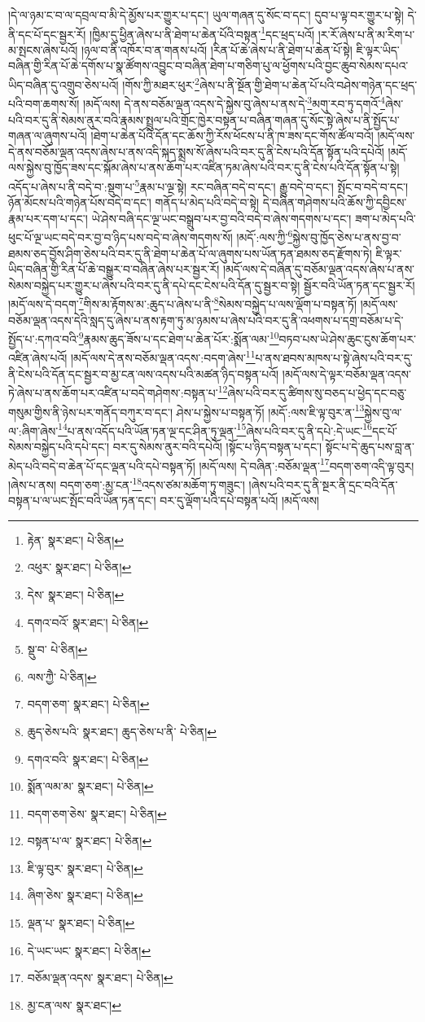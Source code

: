 །དེ་ལ་ཉམ་ང་བ་ལ་དབྲལ་བ་མི་དེ་མྱོས་པར་གྱུར་པ་དང་། ཡུལ་གཞན་དུ་སོང་བ་དང་། དུབ་པ་ལྟ་བར་གྱུར་པ་སྟེ། དེ་ནི་དང་པོ་དང་སྦྱར་རོ། །ཁྱིམ་དུ་ཕྱིན་ཞེས་པ་ནི་ཐེག་པ་ཆེན་པོའི་བསྟན་\footnote{རྟེན་  སྣར་ཐང་།  པེ་ཅིན། }དང་ཕྲད་པའོ། །ར་རོ་ཞེས་པ་ནི་མ་རིག་པ་མ་སྤངས་ཞེས་པའོ། །ཉལ་བ་ནི་འཁོར་བ་ན་གནས་པའོ། །རིན་པོ་ཆེ་ཞེས་པ་ནི་ཐེག་པ་ཆེན་པོ་སྟེ། ཇི་ལྟར་ཡིད་བཞིན་གྱི་རིན་པོ་ཆེ་དགོས་པ་སྣ་ཚོགས་འབྱུང་བ་བཞིན་ཐེག་པ་གཅིག་པུ་ལ་ཕྱོགས་པའི་བྱང་ཆུབ་སེམས་དཔའ་ཡིད་བཞིན་དུ་འགྲུབ་ཅེས་པའོ། །གོས་ཀྱི་མཐར་ཕུར་\footnote{འཕུར་  སྣར་ཐང་།  པེ་ཅིན། }ཞེས་པ་ནི་སྔོན་གྱི་ཐེག་པ་ཆེན་པོ་པའི་བཤེས་གཉེན་དང་ཕྲད་པའི་བག་ཆགས་སོ། །མདོ་ལས། དེ་ནས་བཅོམ་ལྡན་འདས་དེ་སྐྱེས་བུ་ཞེས་པ་ནས་དེ་\footnote{དེས་  སྣར་ཐང་།  པེ་ཅིན། }མགུ་རབ་ཏུ་དགའོ་\footnote{དགའ་བའོ་  སྣར་ཐང་།  པེ་ཅིན། }ཞེས་པའི་བར་དུ་ནི་སེམས་ནུར་བའི་རྣམས་སྤྲུལ་པའི་གྲོང་ཁྱེར་བསྟན་པ་བཞིན་གཞན་དུ་སོང་སྟེ་ཞེས་པ་ནི་སྤྱོད་པ་གཞན་ལ་ཞུགས་པའོ། །ཐེག་པ་ཆེན་པོའི་དོན་དང་ཆོས་ཀྱི་རོས་ཕོངས་པ་ནི་ཁ་ཟས་དང་གོས་ཚོལ་བའོ། །མདོ་ལས་དེ་ནས་བཅོམ་ལྡན་འདས་ཞེས་པ་ནས་འདི་སྐད་སྨྲས་སོ་ཞེས་པའི་བར་དུ་ནི་ངེས་པའི་དོན་སྟོན་པའི་དཔེའོ། །མདོ་ལས་སྐྱེས་བུ་ཁྱོད་ཟས་དང་སྐོམ་ཞེས་པ་ནས་ཆོག་པར་འཛིན་ཏམ་ཞེས་པའི་བར་དུ་ནི་ངེས་པའི་དོན་སྟོན་པ་སྟེ། འདོད་པ་ཞེས་པ་ནི་བདེ་བ་:སྡུག་པ་\footnote{སྡུ་བ་  པེ་ཅིན། }རྣམ་པ་ལྔ་སྟེ། རང་བཞིན་བདེ་བ་དང་། རྒྱུ་བདེ་བ་དང་། སྤོང་བ་བདེ་བ་དང་། ཉོན་མོངས་པའི་གཉེན་པོས་བདེ་བ་དང་། གནོད་པ་མེད་པའི་བདེ་བ་སྟེ། དེ་བཞིན་གཤེགས་པའི་ཆོས་ཀྱི་དབྱིངས་རྣམ་པར་དག་པ་དང་། ཡེ་ཤེས་བཞི་དང་ལྔ་ཡང་བསྒྲུབ་པར་བྱ་བའི་བདེ་བ་ཞེས་གདགས་པ་དང་། ཟག་པ་མེད་པའི་ཕུང་པོ་ལྔ་ཡང་བདེ་བར་བྱ་བ་ཉིད་པས་བདེ་བ་ཞེས་གདགས་སོ། །མདོ་:ལས་ཀྱི་\footnote{ལས་ཀྱཻ་  པེ་ཅིན། }སྐྱེས་བུ་ཁྱོད་ཅེས་པ་ནས་བྱ་བ་ཐམས་ཅད་བྱོས་ཤིག་ཅེས་པའི་བར་དུ་ནི་ཐེག་པ་ཆེན་པོ་ལ་ཞུགས་པས་ཡོན་ཏན་ཐམས་ཅད་རྫོགས་ཏེ། ཇི་ལྟར་ཡིད་བཞིན་གྱི་རིན་པོ་ཆེ་བསྒྱུར་བ་བཞིན་ཞེས་པར་སྦྱར་རོ། །མདོ་ལས་དེ་བཞིན་དུ་བཅོམ་ལྡན་འདས་ཞེས་པ་ནས་སེམས་བསྐྱེད་པར་གྱུར་པ་ཞེས་པའི་བར་དུ་ནི་དཔེ་དང་ངེས་པའི་དོན་དུ་སྦྱར་བ་སྟེ། སྦྱོར་བའི་ཡོན་ཏན་དང་སྦྱར་རོ། །མདོ་ལས་དེ་བདག་\footnote{བདག་ཅག་  སྣར་ཐང་།  པེ་ཅིན། }གིས་མ་རྟོགས་མ་:ཆུད་པ་ཞེས་པ་ནི་\footnote{ཆུད་ཅེས་པའི་  སྣར་ཐང་། ཆུད་ཅེས་པ་ནི་  པེ་ཅིན། }སེམས་བསྐྱེད་པ་ལས་ལྡོག་པ་བསྟན་ཏོ། །མདོ་ལས་བཅོམ་ལྡན་འདས་དེའི་སླད་དུ་ཞེས་པ་ནས་རྟག་ཏུ་མ་ཉམས་པ་ཞེས་པའི་བར་དུ་ནི་འཕགས་པ་དགྲ་བཅོམ་པ་དེ་སྤྱོད་པ་:དཀའ་བའི་\footnote{དགའ་བའི་  སྣར་ཐང་།  པེ་ཅིན། }རྣམས་ཆུད་ཟོས་པ་དང་ཐེག་པ་ཆེན་པོར་:སྨོན་ལམ་\footnote{སྨོན་ལམ་མ་  སྣར་ཐང་།  པེ་ཅིན། }བཏབ་པས་ཡེ་ཤེས་ཆུང་ངུས་ཆོག་པར་འཛིན་ཞེས་པའོ། །མདོ་ལས་དེ་ནས་བཅོམ་ལྡན་འདས་:བདག་ཞེས་\footnote{བདག་ཅག་ཅེས་  སྣར་ཐང་།  པེ་ཅིན། }པ་ནས་ཐབས་མཁས་པ་སྟེ་ཞེས་པའི་བར་དུ་ནི་ངེས་པའི་དོན་དང་སྦྱར་བ་མྱ་ངན་ལས་འདས་པའི་མཚན་ཉིད་བསྟན་པའོ། །མདོ་ལས་དེ་ལྟར་བཅོམ་ལྡན་འདས་ཏེ་ཞེས་པ་ནས་ཆོག་པར་འཛིན་པ་བདེ་གཤེགས་:བསྟན་པ་\footnote{བསྟན་པ་ལ་  སྣར་ཐང་།  པེ་ཅིན། }ཞེས་པའི་བར་དུ་ཚིགས་སུ་བཅད་པ་ཕྱེད་དང་བཅུ་གསུམ་གྱིས་ནི་ཉེས་པར་གནོད་བཀུར་བ་དང་། ཤེས་པ་སྐྱེས་པ་བསྟན་ཏོ། །མདོ་:ལས་ཇི་ལྟ་བུར་ན་\footnote{ཇི་ལྟ་བུར་  སྣར་ཐང་།  པེ་ཅིན། }སྐྱེས་བུ་ལ་ལ་:ཞིག་ཞེས་\footnote{ཞིག་ཅེས་  སྣར་ཐང་།  པེ་ཅིན། }པ་ནས་འདོད་པའི་ཡོན་ཏན་ལྔ་དང་ཤིན་ཏུ་ལྡན་\footnote{ལྡན་པ་  སྣར་ཐང་།  པེ་ཅིན། }ཞེས་པའི་བར་དུ་ནི་དཔེ་:དེ་ཡང་\footnote{དེ་ཡང་ཡང་  སྣར་ཐང་།  པེ་ཅིན། }དང་པོ་སེམས་བསྐྱེད་པའི་དཔེ་དང་། བར་དུ་སེམས་ནུར་བའི་དཔེའོ། །སྟོང་པ་ཉིད་བསྟན་པ་དང་། སྟོང་པ་དེ་ཆུད་པས་བླ་ན་མེད་པའི་བདེ་བ་ཆེན་པོ་དང་ལྡན་པའི་དཔེ་བསྟན་ཏོ། །མདོ་ལས། དེ་བཞིན་:བཅོམ་ལྡན་\footnote{བཅོམ་ལྡན་འདས་  སྣར་ཐང་།  པེ་ཅིན། }བདག་ཅག་འདི་ལྟ་བུར། །ཞེས་པ་ནས། བདག་ཅག་:མྱ་ངན་\footnote{མྱ་ངན་ལས་  སྣར་ཐང་། }འདས་ཙམ་མཆོག་ཏུ་གཟུང་། །ཞེས་པའི་བར་དུ་ནི་སྔར་ནི་དྲང་བའི་དོན་བསྟན་པ་ལ་ཡང་སྤོང་བའི་ཡོན་ཏན་དང་། བར་དུ་ལྡོག་པའི་དཔེ་བསྟན་པའོ། །མདོ་ལས། 